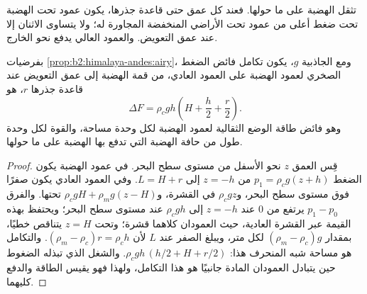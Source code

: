 تثقل الهضبة على ما حولها. فعند كل عمق حتى قاعدة جذرها، يكون عمود
تحت الهضبة تحت ضغط أعلى من عمود تحت الأراضي المنخفضة المجاورة له؛
ولا يتساوى الاثنان إلا عند عمق التعويض. والعمود العالي يدفع نحو الخارج.

\begin{proposition}\label{prop:b2:himalaya-andes:gpe}
بفرضيات \cref{prop:b2:himalaya-andes:airy}، ومع الجاذبية $g$، يكون تكامل
فائض الضغط الصخري لعمود الهضبة على العمود العادي، من قمة
الهضبة إلى عمق التعويض عند قاعدة جذرها $r$، هو
\[
  \Delta F = \rho_c g h \left(H + \frac{h}{2} + \frac{r}{2}\right) .
\]
وهو فائض طاقة الوضع الثقالية لعمود الهضبة لكل وحدة مساحة،
والقوة لكل وحدة طول من حافة الهضبة التي تدفع بها الهضبة على
ما حولها.
\end{proposition}

\begin{proof}
قِس العمق $z$ نحو الأسفل من مستوى سطح البحر. في عمود الهضبة يكون الضغط $p_1 =
\rho_c g (z + h)$ من $z = -h$ إلى $L = H + r$. وفي العمود العادي يكون صفرًا فوق مستوى سطح
البحر، و$\rho_c g z$ في القشرة، و$\rho_c g H + \rho_m g (z - H)$ تحتها. والفرق $p_1
- p_0$ يرتفع من 0 عند $z = -h$ إلى $\rho_c g h$ عند مستوى سطح البحر؛ ويحتفظ بهذه القيمة عبر
القشرة العادية، حيث العمودان كلاهما قشرة؛ وتحت $z = H$ يتناقص خطيًا، بمقدار
$(\rho_m - \rho_c) g$ لكل متر، ويبلغ الصفر عند $L$ لأن $(\rho_m - \rho_c) r = \rho_c
h$. والتكامل هو مساحة شبه المنحرف هذا: $\rho_c g h\,(h/2 + H + r/2)$. والشغل الذي تبذله
الضغوط حين يتبادل العمودان المادة جانبيًا هو هذا التكامل، ولهذا فهو
يقيس الطاقة والدفع كليهما.
\end{proof}

